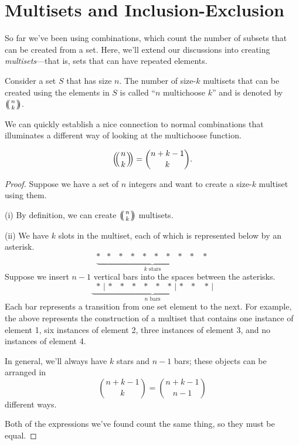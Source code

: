 \documentclass[../m055main.tex]{subfiles}
\begin{document}
\section{Multisets and Inclusion-Exclusion}
So far we've been using combinations, which count the number of subsets that can be created from a set.
Here, we'll extend our discussions into creating \textit{multisets}---that is, sets that can have repeated elements.

\begin{definition}[Multichoose]
    Consider a set $S$ that has size $n$.
    The number of size-$k$ multisets that can be created using the elements in $S$ is called ``$n$ multichoose $k$'' and is denoted by $\mchoose{n}{k}$.
\end{definition}

We can quickly establish a nice connection to normal combinations that illuminates a different way of looking at the multichoose function.

\begin{theorem}
    \[ \mchoose{n}{k} = \binom{n+k-1}{k}. \]
\end{theorem}

\begin{proof}
    Suppose we have a set of $n$ integers and want to create a size-$k$ multiset using them.
    \smallskip

    (i) By definition, we can create $\mchoose{n}{k}$ multisets.
    \smallskip

    (ii) We have $k$ slots in the multiset, each of which is represented below by an asterisk.
    \[ \underbrace{* \,\phantom{|}\, * \,\phantom{|}\, * \,\phantom{|}\, * \,\phantom{|}\, * \,\phantom{|}\, * \,\phantom{|}\, * \,\phantom{|}\, * \,\phantom{|}\, * \,\phantom{|}\,\, *}_{k \text{ stars}} \]
    Suppose we insert $n-1$ vertical bars into the spaces between the asterisks.
    \[ \underbrace{\phantom{|}\,* \,|\, * \,\phantom{|}\, * \,\phantom{|}\, * \,\phantom{|}\, * \,\phantom{|}\, * \,\phantom{|}\, * \,|\, * \,\phantom{|}\, * \,\phantom{|}\,\, *\,|}_{n \text{ bars}} \]
    Each bar represents a transition from one set element to the next.
    For example, the above represents the construction of a multiset that contains one instance of element 1, six instances of element 2, three instances of element 3, and no instances of element 4.

    In general, we'll always have $k$ stars and $n-1$ bars; these objects can be arranged in
    \[ \binom{n+k-1}{k} = \binom{n+k-1}{n-1} \]
    different ways.
    \smallskip

    Both of the expressions we've found count the same thing, so they must be equal.
\end{proof}
\end{document}

